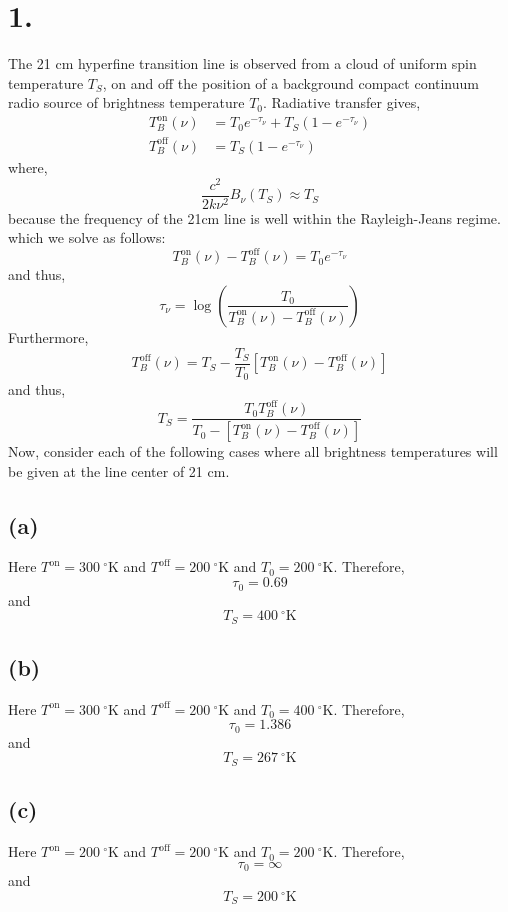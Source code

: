 \documentclass[12pt]{article}
\begin{document}
\newcommand{\Kel}{\: ^\circ\mathrm{K}}


\section*{1.}

The 21 cm hyperfine transition line is observed from a cloud of uniform spin temperature $T_S$, on and off the position of a background compact continuum radio source of brightness temperature $T_0$. Radiative transfer gives, 
\begin{align*}
T_B^{\text{on}}(\nu) & = T_0 e^{-\tau_\nu} + T_S (1 - e^{-\tau_\nu})
\\
T_B^{\text{off}}(\nu) & = T_S (1 - e^{-\tau_\nu})
\end{align*}
where,
\[ \frac{c^2}{2 k \nu^2} B_\nu(T_S) \approx T_S \]
because the frequency of the 21cm line is well within the Rayleigh-Jeans regime.
which we solve as follows:
\[ T_B^{\text{on}}(\nu) - T_B^{\text{off}}(\nu) = T_0 e^{-\tau_\nu} \]
and thus,
\[ \tau_\nu = \log{\left( \frac{T_0}{T_B^{\text{on}}(\nu) - T_B^{\text{off}}(\nu)} \right)} \]
Furthermore,
\[ T_B^{\text{off}}(\nu) = T_S - \frac{T_S}{T_0} [T_B^{\text{on}}(\nu) - T_B^{\text{off}}(\nu)] \]
and thus,
\[ T_S  = \frac{T_0 T_B^{\text{off}}(\nu)}{T_0 - [T_B^{\text{on}}(\nu) - T_B^{\text{off}}(\nu)]} 
\]
Now, consider each of the following cases where all brightness temperatures will be given at the line center of 21 cm. 

\subsection*{(a)}

Here $T^{\text{on}} = 300 \Kel$ and $T^{\text{off}} = 200 \Kel$ and $T_0 = 200 \Kel$. Therefore,
\[ \tau_0 = 0.69 \]
and 
\[ T_S = 400 \Kel \]

\subsection*{(b)}

Here $T^{\text{on}} = 300 \Kel$ and $T^{\text{off}} = 200 \Kel$ and $T_0 = 400 \Kel$. Therefore,
\[ \tau_0 = 1.386 \]
and 
\[ T_S = 267 \Kel \]

\subsection*{(c)}

Here $T^{\text{on}} = 200 \Kel$ and $T^{\text{off}} = 200 \Kel$ and $T_0 = 200 \Kel$. Therefore,
\[ \tau_0 = \infty \]
and 
\[ T_S = 200 \Kel \]
\end{document}
